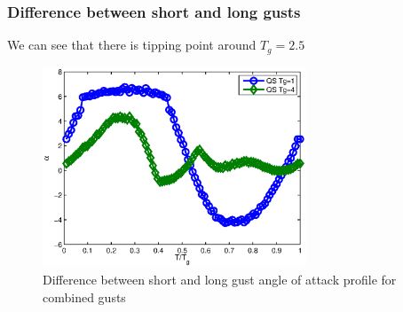 \documentclass[compress]{beamer}
\begin{document}
\begin{frame}
  \frametitle{Difference between short and long gusts}
We can see that there is tipping point around $T_g=2.5$
\begin{figure}[h]
  \centering
  \includegraphics[width=0.7\textwidth]{./Figures/alpha_vs_Tg_QS_short_vs_long_wt3.eps}
  \caption{Difference between short and long gust angle of attack profile for combined gusts}
  \label{fig:short_vs_long_qs_wt=3}
\end{figure}
\end{frame}
\end{document}
